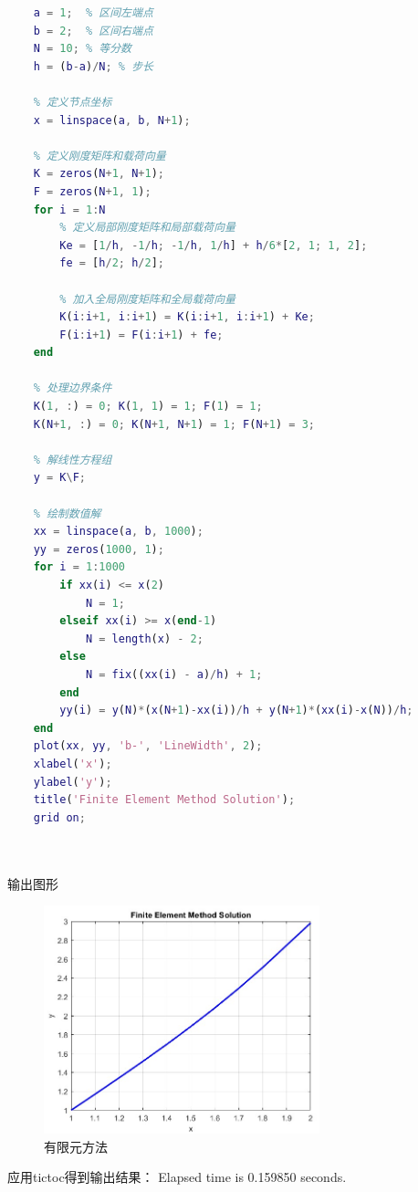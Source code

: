 \documentclass[12pt, a4paper, oneside]{ctexart}
\begin{document}
\begin{spacing}{2.0}
\begin{lstlisting}[language=MATLAB, caption=有限元]
    % 设置参数
    a = 1;  % 区间左端点
    b = 2;  % 区间右端点
    N = 10; % 等分数
    h = (b-a)/N; % 步长
    
    % 定义节点坐标
    x = linspace(a, b, N+1);
    
    % 定义刚度矩阵和载荷向量
    K = zeros(N+1, N+1);
    F = zeros(N+1, 1);
    for i = 1:N
        % 定义局部刚度矩阵和局部载荷向量
        Ke = [1/h, -1/h; -1/h, 1/h] + h/6*[2, 1; 1, 2];
        fe = [h/2; h/2];
        
        % 加入全局刚度矩阵和全局载荷向量
        K(i:i+1, i:i+1) = K(i:i+1, i:i+1) + Ke;
        F(i:i+1) = F(i:i+1) + fe;
    end
    
    % 处理边界条件
    K(1, :) = 0; K(1, 1) = 1; F(1) = 1;
    K(N+1, :) = 0; K(N+1, N+1) = 1; F(N+1) = 3;
    
    % 解线性方程组
    y = K\F;
    
    % 绘制数值解
    xx = linspace(a, b, 1000);
    yy = zeros(1000, 1);
    for i = 1:1000
        if xx(i) <= x(2)
            N = 1;
        elseif xx(i) >= x(end-1)
            N = length(x) - 2;
        else
            N = fix((xx(i) - a)/h) + 1;
        end
        yy(i) = y(N)*(x(N+1)-xx(i))/h + y(N+1)*(xx(i)-x(N))/h;
    end
    plot(xx, yy, 'b-', 'LineWidth', 2);
    xlabel('x');
    ylabel('y');
    title('Finite Element Method Solution');
    grid on;
    
    

\end{lstlisting}
输出图形
\begin{figure}[H]
    \centering
    \includegraphics[width=8cm]{FEMfigure.jpg}
    \caption{有限元方法}
\end{figure}

应用tictoc得到输出结果：
Elapsed time is 0.159850 seconds.


\end{spacing}
\end{document}
